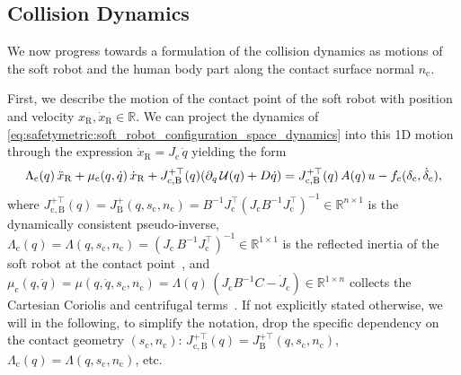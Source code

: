 \subsection{Collision Dynamics}
We now progress towards a formulation of the collision dynamics as motions of the soft robot and the human body part along the contact surface normal $n_\mathrm{c}$.

First, we describe the motion of the contact point of the soft robot with position and velocity $x_\mathrm{R}, \dot{x}_\mathrm{R} \in \mathbb{R}$.
We can project the dynamics of \eqref{eq:safetymetric:soft_robot_configuration_space_dynamics} into this 1D motion through the expression $\dot{x}_\mathrm{R} = J_\mathrm{c} \, \dot{q}$ yielding the form~\citep{khatib1987unified, della2019exact, della2020model, stolzle2024guiding}
\begin{equation}
    \Lambda_\mathrm{c}(q) \, \Ddot{x}_\mathrm{R} + \mu_\mathrm{c}(q,\dot{q}) \, \dot{x}_\mathrm{R} + J_\mathrm{c,B}^{+\top}(q) ( \partial_{q} \, \mathcal{U}(q) + D \dot{q} ) = J_\mathrm{c,B}^{+\top}(q) \, A(q) \, u - f_{\mathrm{c}}(\delta_\mathrm{c}, \dot{\delta}_\mathrm{c}),
\end{equation}
where $J_\mathrm{c,B}^{+\top}(q) = J_\mathrm{B}^+(q,s_\mathrm{c},n_\mathrm{c}) = B^{-1}J_\mathrm{c}^\top(J_\mathrm{c} B^{-1} J_\mathrm{c}^\top)^{-1} \in \mathbb{R}^{n \times 1}$ is the dynamically consistent pseudo-inverse, $\Lambda_\mathrm{c}(q) = \Lambda(q,s_\mathrm{c},n_\mathrm{c}) = (J_\mathrm{c} \, B^{-1} J_\mathrm{c}^\top)^{-1} \in \mathbb{R}^{1 \times 1}$ is the reflected inertia of the soft robot at the contact point~\citep{haddadin2009requirements, Isots_15066_2016}, and $\mu_\mathrm{c}(q,\dot{q}) = \mu(q, \dot{q},s_\mathrm{c},n_\mathrm{c}) = \Lambda(q) \, (J_\mathrm{c} B^{-1} C - \dot{J}_\mathrm{c}) \in \mathbb{R}^{1 \times n}$ collects the Cartesian Coriolis and centrifugal terms~\citep{khatib1987unified}.
If not explicitly stated otherwise, we will in the following, to simplify the notation, drop the specific dependency on the contact geometry $(s_\mathrm{c}, n_\mathrm{c})$: $J_\mathrm{c,B}^{+\top}(q) = J_\mathrm{B}^{+\top}(q,s_\mathrm{c},n_\mathrm{c})$, $\Lambda_\mathrm{c}(q) = \Lambda(q,s_\mathrm{c},n_\mathrm{c})$, etc.

